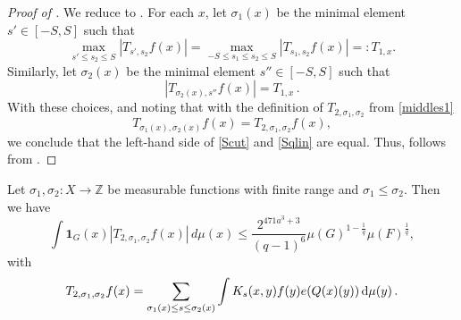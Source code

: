 \begin{proof}[Proof of ]
    \leanok
    We reduce  to . For each $x$, let $\sigma_1(x)$ be the
    minimal element $s'\in [-S,S]$ such that
    \[
    \max_{s'\le s_2\le S} |T_{s',s_2} f(x)| = \max_{-S\le s_1\le s_2\le S} |T_{s_1,s_2} f(x)| =: T_{1,x}.
    \]
    Similarly, let ${\sigma}_2(x)$ be the minimal element $s''\in [-S,S]$ such that
    \[
    |T_{\sigma_2(x), s''} f(x)| = T_{1,x}\,.
    \]
    With these choices, and noting that with the definition of $T_{2, \sigma_1, \sigma_2}$ from \eqref{middles1}
    \begin{equation*}
    T_{\sigma_1(x),\sigma_2(x)} f(x)=T_{2,\sigma_1,\sigma_2} f(x),
    \end{equation*}
    we conclude that the left-hand side of \eqref{Scut} and \eqref{Sqlin} are equal.
    Thus,  follows from .
\end{proof}

\begin{lemma}
    \label{linearized-truncation}
    \leanok
    Let $\sigma_1,\sigma_2\colon X\to \mathbb{Z}$ be measurable functions with finite range and $\sigma_1\leq \sigma_2$.
    Then we have
    \begin{equation} \label{Sqlin}
        \int \mathbf{1}_{G}(x)
        \left| {T}_{2,\sigma_1,\sigma_2}f(x)\right|\, d\mu(x)
        \le \frac{2^{471a^3+3}}{(q-1)^6} \mu(G)^{1-\frac{1}{q}} \mu(F)^{\frac{1}{q}},
    \end{equation}
    with
    \begin{equation}\label{middles1}
        {T}_{2,\sigma_1,\sigma_2}f(x)=\sum_{\sigma_1(x) \le s\le \sigma_2(x)}
        \int K_s(x,y) f(y) e({Q}(x)(y)) \, \mathrm{d}\mu(y)\,.
    \end{equation}
\end{lemma}

